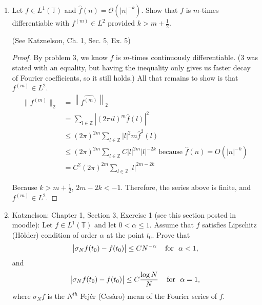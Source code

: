 \documentclass[a4paper]{article}
\newcommand{\Z}{\mathbb{Z}}
\begin{document}
\begin{enumerate}
\begin{proof}
  This is independent of $x$, so $g_n'$ converges uniformly to $g'$. Therefore, $f'(x) = g'(x)$. Also, $\{ g_n' \}$ was a sequence of continuous
  functions, so $f'$ is continuous as well. By applying this result inductively, we get the result for any $m$.

  If $\hat{f}(n) = O(|n|^{-k})$ then
  \[ \hat{f}(n) \leq C |n|^{-k} \]
  for some $C$. Then
  \begin{align*}
    \sum | \hat{f}(n)| |n|^m &\leq C \sum |n|^{m-k} \\
    &\leq \sum |n|^{-1-\varepsilon} \text{ for some } \varepsilon>0 \\
    &< \infty
  \end{align*}
  Therefore, we can apply our result to conclude that $f$ is $m$ times continuously differentiable.

\end{proof}

\item Let $f \in L^1 (\mathbb T)$ and $ \widehat{f} (n ) = \mathcal O (|n|^{-k})$. Show that $f$ is $m$-times  differentiable with $f^{(m)} \in L^2$ provided $k> m +\frac12$.

(See Katznelson, Ch. 1, Sec. 5, Ex. 5)

\begin{proof}

  By problem 3, we know $f$ is $m$-times continuously differentiable. (3 was stated with an equality, but having the inequality only gives us faster
  decay of Fourier coefficients, so it still holds.) All that remains to show is that $f^{(m)} \in L^2$.
  \begin{align*}
    \|f^{(m)}\|_2 &= \left\| \widehat{f^{(m)}} \right\|_2 \\
    &= \sum_{l \in \Z} \left| (2 \pi i l)^m \hat{f}(l) \right|^2 \\
    &\leq (2 \pi)^{2m} \sum_{l \in \Z} |l|^2m \hat{f}^{2}(l) \\
    &\leq (2 \pi)^{2m} \sum_{l \in \Z} C |l|^{2m} |l|^{-2k} \text{ because } \hat{f}(n) = O(|n|^{-k}) \\
    &= C^2 (2 \pi)^{2m} \sum_{l \in \Z} |l|^{2m-2k}
  \end{align*}

  Because $k > m + \frac{1}{2}$, $2m - 2k < -1$. Therefore, the series above is finite, and $f^{(m)} \in L^2$.

\end{proof}

\item Katznelson: Chapter 1, Section 3, Exercise 1 (see this section posted in moodle): Let $f \in L^ 1(\mathbb T)$ and let $0< \alpha \le1$. Assume that $f$ satisfies Lipschitz (H\"older) condition of order $\alpha$ at the point $t_0$. Prove that
$$ \big| \sigma_N f (t_0)   - f(t_0) \big| \le C N^{-\alpha} \,\,\,\,\, \textup{ for } \,\, \alpha<1,$$
and
$$ \big| \sigma_N f (t_0)   - f(t_0) \big| \le C \frac{\log N}{N} \,\,\,\,\, \textup{ for } \,\, \alpha=1,$$
where $\sigma_N f $ is the $N^{th}$ Fej\'er (Ces\`aro) mean of the Fourier series of $f$.

\end{enumerate}
\end{document}
